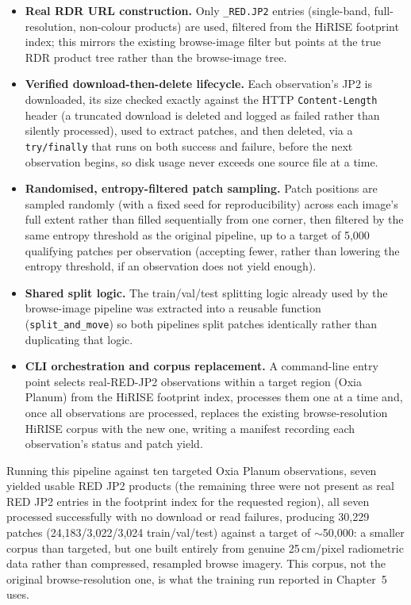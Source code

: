 \begin{itemize}
  \item \textbf{Real RDR URL construction.} Only \texttt{\_RED.JP2} entries (single-band, full-resolution, non-colour products) are used, filtered from the HiRISE footprint index; this mirrors the existing browse-image filter but points at the true RDR product tree rather than the browse-image tree.
  \item \textbf{Verified download-then-delete lifecycle.} Each observation's JP2 is downloaded, its size checked exactly against the HTTP \texttt{Content-Length} header (a truncated download is deleted and logged as failed rather than silently processed), used to extract patches, and then deleted, via a \texttt{try/finally} that runs on both success and failure, before the next observation begins, so disk usage never exceeds one source file at a time.
  \item \textbf{Randomised, entropy-filtered patch sampling.} Patch positions are sampled randomly (with a fixed seed for reproducibility) across each image's full extent rather than filled sequentially from one corner, then filtered by the same entropy threshold as the original pipeline, up to a target of 5,000 qualifying patches per observation (accepting fewer, rather than lowering the entropy threshold, if an observation does not yield enough).
  \item \textbf{Shared split logic.} The train/val/test splitting logic already used by the browse-image pipeline was extracted into a reusable function (\texttt{split\_and\_move}) so both pipelines split patches identically rather than duplicating that logic.
  \item \textbf{CLI orchestration and corpus replacement.} A command-line entry point selects real-RED-JP2 observations within a target region (Oxia Planum) from the HiRISE footprint index, processes them one at a time and, once all observations are processed, replaces the existing browse-resolution HiRISE corpus with the new one, writing a manifest recording each observation's status and patch yield.
\end{itemize}

Running this pipeline against ten targeted Oxia Planum observations, seven yielded usable RED JP2 products (the remaining three were not present as real RED JP2 entries in the footprint index for the requested region), all seven processed successfully with no download or read failures, producing 30,229 patches (24,183/3,022/3,024 train/val/test) against a target of $\sim$50,000: a smaller corpus than targeted, but one built entirely from genuine 25\,cm/pixel radiometric data rather than compressed, resampled browse imagery. This corpus, not the original browse-resolution one, is what the training run reported in Chapter~5 uses.

